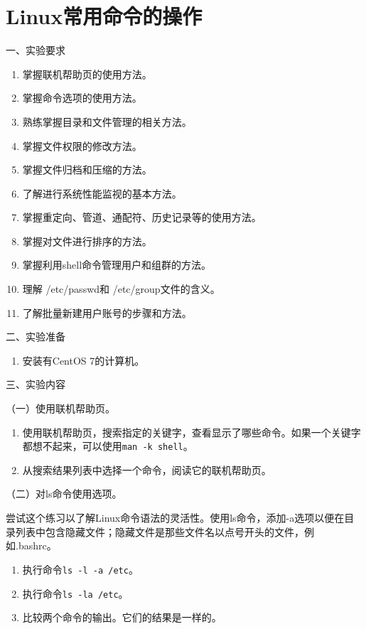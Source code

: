 \chapter{Linux常用命令的操作}

\noindent
一、实验要求
\begin{enumerate}
  \item 掌握联机帮助页的使用方法。
  \item 掌握命令选项的使用方法。
  \item 熟练掌握目录和文件管理的相关方法。
  \item 掌握文件权限的修改方法。
  \item 掌握文件归档和压缩的方法。
  \item 了解进行系统性能监视的基本方法。
  \item 掌握重定向、管道、通配符、历史记录等的使用方法。
  \item 掌握对文件进行排序的方法。
  \item 掌握利用shell命令管理用户和组群的方法。
  \item 理解 /etc/passwd和 /etc/group文件的含义。
  \item 了解批量新建用户账号的步骤和方法。
\end{enumerate}

\vspace{0.2in}
\noindent
二、实验准备
\begin{enumerate}
  \item 安装有CentOS 7的计算机。
\end{enumerate}

\vspace{0.2in}
\noindent
三、实验内容

\vspace{0.1in}
（一）使用联机帮助页。
\begin{enumerate}
  \item 使用联机帮助页，搜索指定的关键字，查看显示了哪些命令。如果一个关键字都想不起来，可以使用\verb|man -k shell|。
  \item 从搜索结果列表中选择一个命令，阅读它的联机帮助页。
\end{enumerate}

\vspace{0.1in}
（二）对ls命令使用选项。

尝试这个练习以了解Linux命令语法的灵活性。使用ls命令，添加-a选项以便在目录列表中包含隐藏文件；隐藏文件是那些文件名以点号开头的文件，例如.bashrc。
\begin{enumerate}
  \item 执行命令\verb|ls -l -a /etc|。
  \item 执行命令\verb|ls -la /etc|。
  \item 比较两个命令的输出。它们的结果是一样的。
\end{enumerate}

